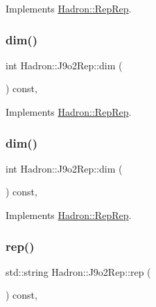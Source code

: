 Implements \mbox{\hyperlink{structHadron_1_1RepRep_a92c8802e5ed7afd7da43ccfd5b7cd92b}{Hadron\+::\+Rep\+Rep}}.

\mbox{\label{structHadron_1_1J9o2Rep_a66921d681b6217d1ef68bc63ad21cd15}} 
\subsubsection{\texorpdfstring{dim()}{dim()}\hspace{0.1cm}{\footnotesize\ttfamily [4/5]}}
{\footnotesize\ttfamily int Hadron\+::\+J9o2\+Rep\+::dim (\begin{DoxyParamCaption}{ }\end{DoxyParamCaption}) const\hspace{0.3cm}{\ttfamily [inline]}, {\ttfamily [virtual]}}



Implements \mbox{\hyperlink{structHadron_1_1RepRep_a92c8802e5ed7afd7da43ccfd5b7cd92b}{Hadron\+::\+Rep\+Rep}}.

\mbox{\label{structHadron_1_1J9o2Rep_a66921d681b6217d1ef68bc63ad21cd15}} 
\subsubsection{\texorpdfstring{dim()}{dim()}\hspace{0.1cm}{\footnotesize\ttfamily [5/5]}}
{\footnotesize\ttfamily int Hadron\+::\+J9o2\+Rep\+::dim (\begin{DoxyParamCaption}{ }\end{DoxyParamCaption}) const\hspace{0.3cm}{\ttfamily [inline]}, {\ttfamily [virtual]}}



Implements \mbox{\hyperlink{structHadron_1_1RepRep_a92c8802e5ed7afd7da43ccfd5b7cd92b}{Hadron\+::\+Rep\+Rep}}.

\mbox{\label{structHadron_1_1J9o2Rep_ad83e9b0b6221fcaeeeed5f2653890334}} 
\subsubsection{\texorpdfstring{rep()}{rep()}\hspace{0.1cm}{\footnotesize\ttfamily [1/5]}}
{\footnotesize\ttfamily std\+::string Hadron\+::\+J9o2\+Rep\+::rep (\begin{DoxyParamCaption}{ }\end{DoxyParamCaption}) const\hspace{0.3cm}{\ttfamily [inline]}, {\ttfamily [virtual]}}



